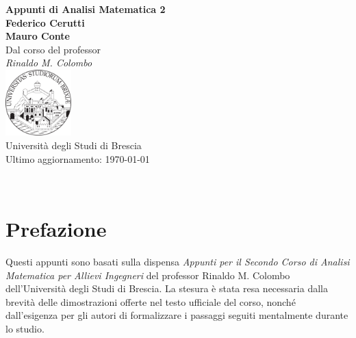 \documentclass[a4paper,twoside,italian,11pt]{book}
\begin{document}
\pagestyle{headings}

\frontmatter
\begin{titlepage}
	\begin{center}
		{\huge\bfseries Appunti di Analisi Matematica 2\\}
		\vspace{1.5cm}
		{\Large\bfseries Federico Cerutti\\Mauro Conte\\}
		\vspace{2cm}
		{Dal corso del professor}\\[5pt]
		\emph{{Rinaldo M. Colombo}}\\[2cm]
		\vfill
		\includegraphics[width=0.19\textwidth]{unibs-logo.png}\\[5pt]
		{Università degli Studi di Brescia}\\[10pt]
		{Ultimo aggiornamento: \today}
	\end{center}
\end{titlepage}

~
\vfill
\doclicenseThis

\cleardoublepage
{}
\tableofcontents


\mainmatter
\chapter*{Prefazione}\label{chap:foreword}
Questi appunti sono basati sulla dispensa \textit{Appunti per il Secondo Corso di Analisi Matematica per Allievi Ingegneri} del professor Rinaldo M. Colombo dell'Università degli Studi di Brescia. La stesura è stata resa necessaria dalla brevità delle dimostrazioni offerte nel testo ufficiale del corso, nonché dall'esigenza per gli autori di formalizzare i passaggi seguiti mentalmente durante lo studio.
\vspace*{\baselineskip}
\end{document}
